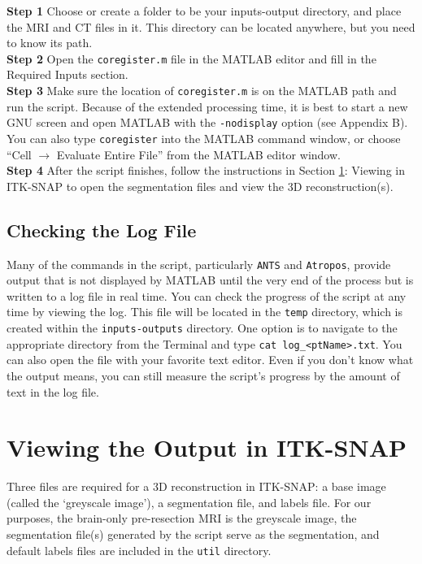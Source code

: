 \documentclass[12pt]{article}
\begin{document}
\textbf{Step 1} Choose or create a folder to be your inputs-output directory, and place the MRI and CT files in it. This directory can be located anywhere, but you need to know its path. \\
\textbf{Step 2} Open the \texttt{coregister.m} file in the MATLAB editor and fill in the Required Inputs section. \\
\textbf{Step 3} Make sure the location of \texttt{coregister.m} is on the MATLAB path and run the script. Because of the extended processing time, it is best to start a new GNU screen and open MATLAB with the \texttt{-nodisplay} option (see Appendix B). You can also type \texttt{coregister} into the MATLAB command window, or choose ``Cell $\rightarrow$ Evaluate Entire File'' from the MATLAB editor window. \\
\textbf{Step 4} After the script finishes, follow the instructions in Section \ref{sec: viewing}: Viewing in ITK-SNAP to open the segmentation files and view the 3D reconstruction(s). \\

\subsection*{Checking the Log File} Many of the commands in the script, particularly \texttt{ANTS} and \texttt{Atropos}, provide output that is not displayed by MATLAB until the very end of the process but is written to a log file in real time. You can check the progress of the script at any time by viewing the log. This file will be located in the \texttt{temp} directory, which is created within the \texttt{inputs-outputs} directory. One option is to navigate to the appropriate directory from the Terminal and type 
\texttt{cat log\_<ptName>.txt}. You can also open the file with your favorite text editor. Even if you don't know what the output means, you can still measure the script's progress by the amount of text in the log file.

\section{Viewing the Output in ITK-SNAP}
\label{sec: viewing}
Three files are required for a 3D reconstruction in ITK-SNAP: a base image (called the `greyscale image'), a segmentation file, and labels file. For our purposes, the brain-only pre-resection MRI is the greyscale image, the segmentation file(s) generated by the script serve as the segmentation, and default labels files are included in the \texttt{util} directory.
\end{document}
